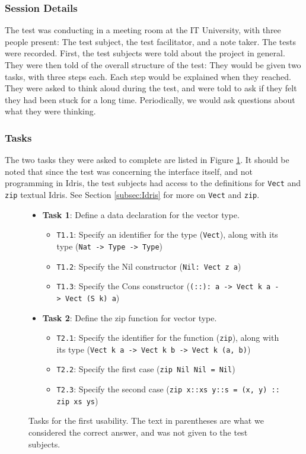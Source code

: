 \subsubsection{Session Details}
The test was conducting in a meeting room at the IT University, with three
people present: The test subject, the test facilitator, and a note taker. The
tests were recorded. First, the test subjects were told about the project in
general. They were then told of the overall structure of the test: They would
be given two tasks, with three steps each. Each step would be explained when
they reached. They were asked to think aloud during the test, and were told to
ask if they felt they had been stuck for a long time. Periodically, we would
ask questions about what they were thinking.

\subsubsection{Tasks}
The two tasks they were asked to complete are listed in Figure \ref{figure:first_tasks}.
It should be noted that since the test was concerning the interface itself, and
not programming in Idris, the test subjects had access to the definitions for \texttt{Vect} and \texttt{zip} textual Idris. See Section \ref{subsec:Idris}
for more on \texttt{Vect} and \texttt{zip}.

\begin{figure}
\centering
\begin{itemize}
	\item \textbf{Task 1}: Define a data declaration for the vector type.
	\begin{itemize}
		\item \texttt{T1.1}: Specify an identifier for the type (\texttt{Vect}), along with its type (\texttt{Nat -> Type -> Type})
		\item \texttt{T1.2}: Specify the Nil constructor (\texttt{Nil: Vect z a})
		\item \texttt{T1.3}: Specify the Cons constructor (\texttt{(::): a -> Vect k a -> Vect (S k) a})
	\end{itemize}
	\item \textbf{Task 2}: Define the zip function for vector type.
	\begin{itemize}
		\item \texttt{T2.1}: Specify the identifier for the function (\texttt{zip}), along with its type (\texttt{Vect k a -> Vect k b -> Vect k (a, b)})
		\item \texttt{T2.2}: Specify the first case (\texttt{zip Nil Nil = Nil})
		\item \texttt{T2.3}: Specify the second case (\texttt{zip x::xs y::s = (x, y) :: zip xs ys})
	\end{itemize}
\end{itemize}
\caption{Tasks for the first usability. The text in parentheses are what we considered the correct answer, and was not given to the test subjects.}
\label{figure:first_tasks}
\end{figure}

